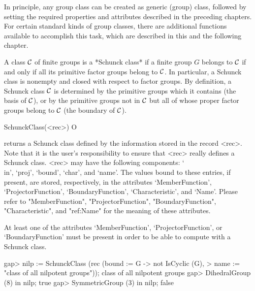 
In principle, any group class can be created as generic (group) class,
followed by setting the required properties and attributes described in the
preceding chapters. For certain standard kinds of group classes, there are additional
functions available to accomplish this task, which are described in this and the
following chapter.


\null


A class $\cal C$ of finite groups is a *Schunck class* if a finite group
$G$ belongs to $\cal C$ if and only if all its primitive factor groups
belong to $\cal C$. In particular, a Schunck class is nonempty and closed
with respect to factor groups. By definition, a Schunck class $\cal C$ is
determined by the primitive groups which it contains (the basis of $\cal C$),
or by the primitive groups not in $\cal C$ but all of whose proper factor
groups belong to $\cal C$ (the boundary of $\cal C$).

\>SchunckClass(<rec>) O

returns a Schunck class defined by the information stored in the record
<rec>. Note that it is the user's responsibility to ensure that <rec> really
defines a Schunck class. <rec> may have the following components: `\\in',
`proj', `bound', `char', and `name'. The values bound to these entries, if
present, are stored, respectively, in the attributes `MemberFunction', 
`ProjectorFunction', `BoundaryFunction', `Characteristic', and `Name'.
Please refer to "MemberFunction", 
"ProjectorFunction", "BoundaryFunction", "Characteristic", and "ref:Name"
for the meaning of these attributes.

At least one of the attributes `MemberFunction', `ProjectorFunction', or
`BoundaryFunction' must be present in order to be able to compute
with a Schunck class. 

\beginexample
gap> nilp := SchunckClass (rec (bound := G -> not IsCyclic (G),
>        name := "class of all nilpotent groups"));
class of all nilpotent groups
gap> DihedralGroup (8) in nilp;
true
gap> SymmetricGroup (3) in nilp;
false
\endexample

